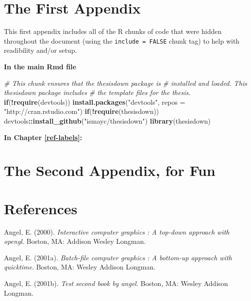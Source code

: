 \documentclass[12pt,twoside]{reedthesis}
\newenvironment{Shaded}{\begin{snugshade}}{\end{snugshade}}
\newcommand{\CommentTok}[1]{\textcolor[rgb]{0.56,0.35,0.01}{\textit{#1}}}
\newcommand{\ControlFlowTok}[1]{\textcolor[rgb]{0.13,0.29,0.53}{\textbf{#1}}}
\newcommand{\DataTypeTok}[1]{\textcolor[rgb]{0.13,0.29,0.53}{#1}}
\newcommand{\KeywordTok}[1]{\textcolor[rgb]{0.13,0.29,0.53}{\textbf{#1}}}
\newcommand{\NormalTok}[1]{#1}
\newcommand{\OperatorTok}[1]{\textcolor[rgb]{0.81,0.36,0.00}{\textbf{#1}}}
\newcommand{\StringTok}[1]{\textcolor[rgb]{0.31,0.60,0.02}{#1}}
\theoremstyle{definition}
\theoremstyle{definition}
\theoremstyle{definition}
\theoremstyle{remark}
\begin{document}
\appendix

\hypertarget{the-first-appendix}{%
\chapter{The First Appendix}\label{the-first-appendix}}

This first appendix includes all of the R chunks of code that were
hidden throughout the document (using the \texttt{include\ =\ FALSE}
chunk tag) to help with readibility and/or setup.

\textbf{In the main Rmd file}
\begin{Shaded}
\begin{Highlighting}[]
\CommentTok{# This chunk ensures that the thesisdown package is}
\CommentTok{# installed and loaded. This thesisdown package includes}
\CommentTok{# the template files for the thesis.}
\ControlFlowTok{if}\NormalTok{(}\OperatorTok{!}\KeywordTok{require}\NormalTok{(devtools))}
  \KeywordTok{install.packages}\NormalTok{(}\StringTok{"devtools"}\NormalTok{, }\DataTypeTok{repos =} \StringTok{"http://cran.rstudio.com"}\NormalTok{)}
\ControlFlowTok{if}\NormalTok{(}\OperatorTok{!}\KeywordTok{require}\NormalTok{(thesisdown))}
\NormalTok{  devtools}\OperatorTok{::}\KeywordTok{install_github}\NormalTok{(}\StringTok{"ismayc/thesisdown"}\NormalTok{)}
\KeywordTok{library}\NormalTok{(thesisdown)}
\end{Highlighting}
\end{Shaded}
\textbf{In Chapter \ref{ref-labels}:}

\hypertarget{the-second-appendix-for-fun}{%
\chapter{The Second Appendix, for
Fun}\label{the-second-appendix-for-fun}}

\backmatter

\hypertarget{references}{%
\chapter*{References}\label{references}}


\noindent

\setlength{\parindent}{-0.20in}
\setlength{\leftskip}{0.20in}
\setlength{\parskip}{8pt}

\hypertarget{refs}{}
\leavevmode\hypertarget{ref-angel2000}{}%
Angel, E. (2000). \emph{Interactive computer graphics : A top-down
approach with opengl}. Boston, MA: Addison Wesley Longman.

\leavevmode\hypertarget{ref-angel2001}{}%
Angel, E. (2001a). \emph{Batch-file computer graphics : A bottom-up
approach with quicktime}. Boston, MA: Wesley Addison Longman.

\leavevmode\hypertarget{ref-angel2002a}{}%
Angel, E. (2001b). \emph{Test second book by angel}. Boston, MA: Wesley
Addison Longman.


\end{document}
